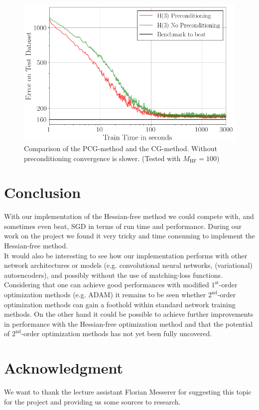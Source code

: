\documentclass[conference]{IEEEtran}
\begin{document}
	\begin{figure}[htbp]
		\centerline{\includegraphics[scale=0.53]{Precond.png}}
		\caption{Comparison of the PCG-method and the CG-method. Without preconditioning convergence is slower. (Tested with $M_{\mathrm{HF}}=100$)}
		\label{fig4}
	\end{figure}



	\section{Conclusion}
	\noindent
	With our implementation of the Hessian-free method we could compete with, and sometimes even beat, SGD in terms of run time and performance.
	During our work on the project we found it very tricky and time consuming to implement the Hessian-free method.\\
	It would also be interesting to see how our implementation performs with other network architectures or models (e.g. convolutional neural networks, (variational) autoencoders), and possibly without the use of matching-loss functions.\\
	Considering that one can achieve good performances with modified $1^{\text{st}}$-order optimization methods (e.g. ADAM) it remains to be seen whether $2^{\text{nd}}$-order optimization methods can gain a foothold within standard network training methods. On the other hand it could be possible to achieve further improvements in performance with the Hessian-free optimization method and that the potential of $2^{\text{nd}}$-order optimization methods has not yet been fully uncovered.

	\section*{Acknowledgment}
	\noindent
	We want to thank the lecture assistant Florian Messerer for suggesting this topic for the project and providing us some sources to research.
\end{document}
